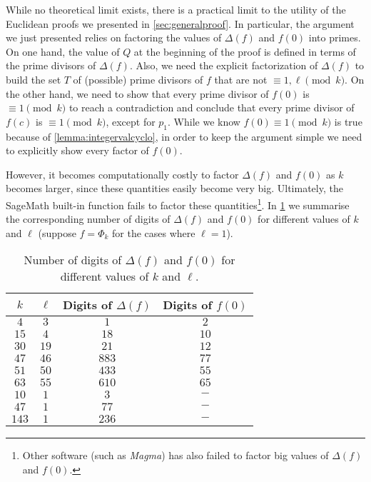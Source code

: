\documentclass[../main.tex]{subfiles}
\begin{document}
While no theoretical limit exists, there is a practical limit to the utility of the Euclidean proofs we presented in \cref{sec:generalproof}. In particular, the argument we just presented relies on factoring the values of $\Delta(f)$ and $f(0)$ into primes. On one hand, the value of $Q$ at the beginning of the proof is defined in terms of the prime divisors of $\Delta(f)$. Also, we need the explicit factorization of $\Delta(f)$ to build the set $T$ of (possible) prime divisors of $f$ that are not $\equiv 1, \ell\pmod{k}$. On the other hand, we need to show that every prime divisor of $f(0)$ is $\equiv 1\pmod{k}$ to reach a contradiction and conclude that every prime divisor of $f(c)$ is $\equiv 1 \pmod{k}$, except for $p_1$. While we know $f(0)\equiv 1\pmod{k}$ is true because of \cref{lemma:integervalcyclo}, in order to keep the argument simple we need to explicitly show every factor of $f(0)$.

However, it becomes computationally costly to factor $\Delta(f)$ and $f(0)$ as $k$ becomes larger, since these quantities easily become very big. Ultimately, the SageMath built-in function \textcolor{blue}{} fails to factor these quantities\footnote{Other software (such as \textit{Magma}) has also failed to factor big values of $\Delta(f)$ and $f(0)$.}. In \cref{tab:exectimes} we summarise the corresponding number of digits of $\Delta(f)$ and $f(0)$ for different values of $k$ and $\ell$ (suppose $f=\Phi_k$ for the cases where $\ell=1$).

\begin{table}[H]
	\caption{Number of digits of $\Delta(f)$ and $f(0)$ for different values of $k$ and $\ell$.}
	\begin{center}
		\begin{tabular}{cccc}
			\hline \hline $k$ & $\ell$ & \textbf{Digits of} $\Delta(f)$ & \textbf{Digits of} $f(0)$ \\ \hline
		    $4$ & $3$ & $1$ & $2$ \\ 
		    $15$ & $4$ & $18$ & $10$  \\
		    $30$ & $19$ & $21$ & $12$  \\
			$47$ & $46$ & $883$ & $77$  \\ 
			$51$ & $50$ & $433$ & $55$ \\ 
			$63$ & $55$ & $610$ & $65$ \\ 
			$10$ & $1$ & $3$ & $-$ \\ 
			$47$ & $1$ & $77$ & $-$ \\
			$143$ & $1$ & $236$ & $-$ \\ 
			\hline \hline
		\end{tabular}
		\label{tab:exectimes}
	\end{center}
\end{table}
\end{document}
